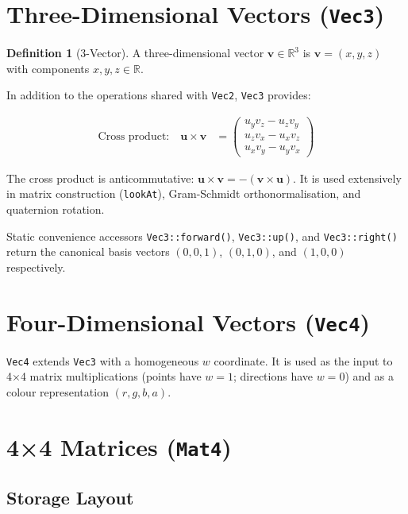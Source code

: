 \documentclass[12pt, a4paper]{report}
\theoremstyle{definition}
\newtheorem{definition}{Definition}[section]
\theoremstyle{remark}
\begin{document}
\section{Three-Dimensional Vectors (\texttt{Vec3})}

\begin{definition}[3-Vector]
A three-dimensional vector $\mathbf{v} \in \mathbb{R}^3$ is
$\mathbf{v} = (x, y, z)$ with components $x, y, z \in \mathbb{R}$.
\end{definition}

In addition to the operations shared with \texttt{Vec2}, \texttt{Vec3}
provides:

\begin{align}
  \text{Cross product:} \quad
  \mathbf{u} \times \mathbf{v} &=
  \begin{pmatrix} u_y v_z - u_z v_y \\ u_z v_x - u_x v_z \\ u_x v_y - u_y v_x \end{pmatrix}
\end{align}

The cross product is anticommutative: $\mathbf{u} \times \mathbf{v} = -(\mathbf{v} \times \mathbf{u})$.
It is used extensively in matrix construction (\texttt{lookAt}),
Gram-Schmidt orthonormalisation, and quaternion rotation.

Static convenience accessors \texttt{Vec3::forward()}, \texttt{Vec3::up()},
and \texttt{Vec3::right()} return the canonical basis vectors
$(0,0,1)$, $(0,1,0)$, and $(1,0,0)$ respectively.

\section{Four-Dimensional Vectors (\texttt{Vec4})}

\texttt{Vec4} extends \texttt{Vec3} with a homogeneous $w$ coordinate.
It is used as the input to 4×4 matrix multiplications (points have
$w = 1$; directions have $w = 0$) and as a colour representation
$(r, g, b, a)$.

\section{4×4 Matrices (\texttt{Mat4})}

\subsection{Storage Layout}
\end{document}
